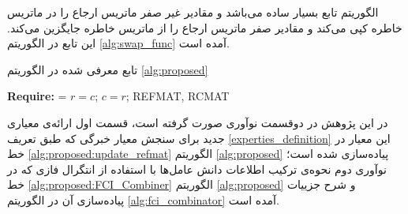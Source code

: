 الگوریتم تابع  بسیار ساده می‌باشد و مقادیر غیر صفر ماتریس ارجاع را در ماتریس خاطره کپی می‌کند و مقادیر صفر ماتریس ارجاع را از ماتریس خاطره جایگزین می‌کند. این تابع در الگوریتم
\ref{alg:swap_func}
آمده است.

\begin{algorithm}[t]
\caption{تابع  معرفی شده در الگوریتم \ref{alg:proposed}}\label{alg:swap_func}
\begin{latin}
\begin{algorithmic}[1]
\State \textbf{Require:}  = 
			\State $r = c$;
		\Else
			\State $c = r$;
		\EndIf
	\EndFor
	\State \Return REFMAT, RCMAT
\EndFunction
\end{algorithmic}
\end{latin}
\end{algorithm}

در این پژوهش در دوقسمت نوآوری صورت گرفته است، قسمت اول ارائه‌ی معیاری جدید برای سنجش معیار خبرگی که طبق تعریف
\ref{experties_definition}
این معیار در خط
\ref{alg:proposed:update_refmat}
الگوریتم
\ref{alg:proposed}
پیاده‌سازی شده است؛ نوآوری دوم نحوه‌ی ترکیب اطلاعات دانش عامل‌ها با استفاده از انتگرال فازی که در خط
\ref{alg:proposed:FCI_Combiner}
الگوریتم
\ref{alg:proposed}
و شرح جزییات پیاده‌سازی آن در الگوریتم
\ref{alg:fci_combinator}
آمده است.

